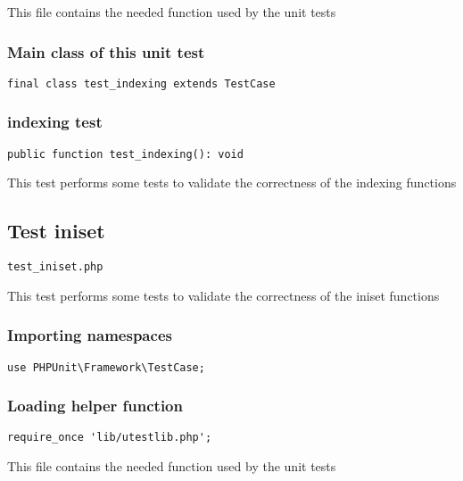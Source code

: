 \documentclass[a4paper]{article}
\begin{document}
This file contains the needed function used by the unit tests

\hypertarget{toc242}{}
\subsubsection{Main class of this unit test}

\begin{lstlisting}
final class test_indexing extends TestCase
\end{lstlisting}

\hypertarget{toc243}{}
\subsubsection{indexing test}

\begin{lstlisting}
public function test_indexing(): void
\end{lstlisting}

This test performs some tests to validate the correctness
of the indexing functions

\hypertarget{toc244}{}
\subsection{Test iniset}

\begin{lstlisting}
test_iniset.php
\end{lstlisting}

This test performs some tests to validate the correctness
of the iniset functions

\hypertarget{toc245}{}
\subsubsection{Importing namespaces}

\begin{lstlisting}
use PHPUnit\Framework\TestCase;
\end{lstlisting}

\hypertarget{toc246}{}
\subsubsection{Loading helper function}

\begin{lstlisting}
require_once 'lib/utestlib.php';
\end{lstlisting}

This file contains the needed function used by the unit tests
\end{document}
